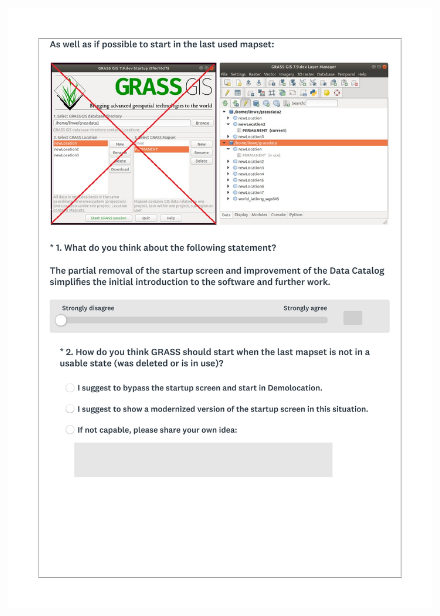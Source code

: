 \documentclass[a4paper,10pt,twoside]{article}
\begin{document}
 \newpage
 \begin{figure}[hbt!]
 \begin{center}
 \includegraphics[width=15.5cm]{../surveys/questionnaires/survey1_part1_page3_questions1_2.pdf}
 \end{center}
 \end{figure}
 
\end{document}
